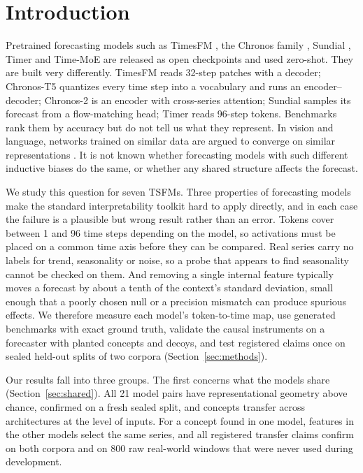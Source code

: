\section{Introduction}
\label{sec:intro}

Pretrained forecasting models such as TimesFM \citep{das2024timesfm}, the Chronos family
\citep{ansari2024chronos,ansari2025chronos2}, Sundial \citep{liu2025sundial}, Timer \citep{liu2024timer} and Time-MoE
\citep{shi2025timemoe} are released as open checkpoints and used zero-shot. They are built very differently. TimesFM
reads 32-step patches with a decoder; Chronos-T5 quantizes every time step into a vocabulary and runs an
encoder--decoder; Chronos-2 is an encoder with cross-series attention; Sundial samples its forecast from a flow-matching
head; Timer reads 96-step tokens. Benchmarks rank them by accuracy but do not tell us what they represent. In
vision and language, networks trained on similar data are argued to converge on similar representations
\citep{li2016convergent,huh2024platonic}. It is not known whether
forecasting models with such different inductive biases do the same, or whether any shared structure affects the
forecast.

We study this question for seven TSFMs. Three properties of forecasting models make the standard interpretability
toolkit \citep{kornblith2019cka,meng2022rome,bricken2023monosemanticity} hard to apply directly, and in each case the
failure is a plausible but wrong result rather than an error. Tokens cover between 1 and 96 time steps depending on the
model, so activations must be placed on a common time axis before they can be compared. Real series carry no labels for
trend, seasonality or noise, so a probe that appears to find seasonality cannot be checked on them. And removing a single
internal feature typically moves a forecast by about a tenth of the context's standard deviation, small enough that a
poorly chosen null or a precision mismatch can produce spurious effects. We therefore measure each model's token-to-time
map, use generated benchmarks with exact ground truth, validate the causal instruments on a forecaster with planted
concepts and decoys, and test registered claims once on sealed held-out splits of two corpora
(Section~\ref{sec:methods}).

Our results fall into three groups. The first concerns what the models share (Section~\ref{sec:shared}). All 21 model
pairs have representational geometry above chance, confirmed on a fresh sealed split, and concepts transfer across
architectures at the level of inputs. For a concept found in one model, features in the other models select the same
series, and all registered transfer claims confirm on both corpora and on 800 raw real-world windows that were never used
during development.

